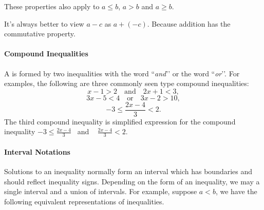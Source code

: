 \begin{note}
These properties also apply to $a\leq b$, $a>b$ and $a\geq b$.
\end{note} 

\begin{trick}
	It's always better to view $a-c$ as $a+(-c)$. Because addition has the commutative property.
\end{trick}

\paragraph*{Compound Inequalities}
A  is formed by two inequalities with the word ``\textit{and}\rq\rq{} or the word ``\textit{or}\rq\rq{}. For examples, the following are three commonly seen type compound inequalities:
	$$
	x-1>2\quad \text{and} \quad 2x+1<3,
	$$
	$$
	3x-5<4\quad \text{or} \quad 3x-2>10,
	$$
	$$
	-3\leq \frac{2x-4}{3}<2.
	$$
	The third compound inequality is simplified expression for the compound inequality $-3\leq \frac{2x-4}{3}$~ and ~ $\frac{2x-4}{3}<2$.

\paragraph*{Interval Notations}
Solutions to an inequality normally form an interval which has boundaries and should reflect inequality signs. Depending on the form of  an inequality, we may a single interval and a union of intervals. For example, suppose $a<b$, we have the following equivalent representations of inequalities.

